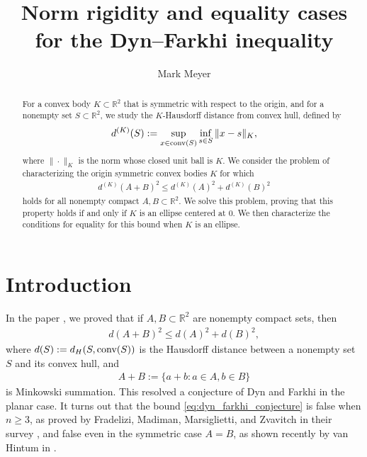 \documentclass[11pt]{article}
\title{Norm rigidity and equality cases for the Dyn--Farkhi inequality}
\author{Mark Meyer}
\begin{document}
\maketitle

\begin{abstract}
    For a convex body $K\subset\mathbb{R}^2$ that is symmetric with respect to the origin, and for a nonempty set $S\subset\mathbb{R}^2$, we study the $K$-Hausdorff distance from convex hull, defined by
    \begin{align*}
        d^{(K)}(S):=\sup_{x\in \textup{conv}(S)}\inf_{s\in S}\|x-s\|_K,
    \end{align*}
    where $\|\cdot \|_K$ is the norm whose closed unit ball is $K$. We consider the problem of characterizing the origin symmetric convex bodies $K$ for which 
    \begin{align*}
        d^{(K)}(A+B)^2\leq d^{(K)}(A)^2+d^{(K)}(B)^2
    \end{align*}
    holds for all nonempty compact $A,B\subset\mathbb{R}^2$. We solve this problem, proving that this property holds if and only if $K$ is an ellipse centered at $0$. We then characterize the conditions for equality for this bound when $K$ is an ellipse. 
\end{abstract}


\section{Introduction}

In the paper \cite{meyer2}, we proved that if $A,B\subset\mathbb{R}^2$ are nonempty compact sets, then
\begin{align}\label{eq:dyn_farkhi_conjecture}
    d(A+B)^2\leq d(A)^2+d(B)^2,
\end{align}
where $d(S):=d_H(S,\textup{conv}(S))$ is the Hausdorff distance between a nonempty set $S$ and its convex hull, and 
\begin{align*}
    A+B:=\{a+b:a\in A,b\in B\}
\end{align*}
is Minkowski summation. This resolved a conjecture of Dyn and Farkhi \cite{dyn1} in the planar case. It turns out that the bound \eqref{eq:dyn_farkhi_conjecture} is false when $n\geq 3$, as proved by Fradelizi, Madiman, Marsiglietti, and Zvavitch in their survey \cite{fradelizi1}, and false even in the symmetric case $A=B$, as shown recently by van Hintum in \cite{vanHintum}.
\end{document}
